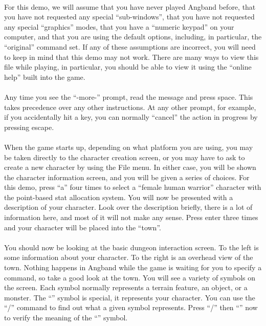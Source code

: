 \paragraph{}For this demo, we will assume that you have never played Angband before,
that you have not requested any special ``sub-windows'', that you have not
requested any special ``graphics'' modes, that you have a ``numeric
keypad''
on your computer, and that you are using the default options, including,
in particular, the ``original'' command set. If any of these assumptions
are incorrect, you will need to keep in mind that this demo may not
work. There are many ways to view this file while playing, in
particular, you should be able to view it using the ``online help'' built
into the game.

\paragraph{}Any time you see the ``-more-'' prompt, read the message and press space.
This takes precedence over any other instructions. At any other prompt,
for example, if you accidentally hit a key, you can normally ``cancel''
the action in progress by pressing escape.

\paragraph{}When the game starts up, depending on what platform you are using, you
may be taken directly to the character creation screen, or you may have
to ask to create a new character by using the File menu. In either
case, you will be shown the character information screen, and you will
be given a series of choices. For this demo, press ``a'' four times to
select a ``female human warrior'' character with the point-based stat
allocation system. You will now be presented with a description of your
character. Look over the description briefly, there is a lot of
information here, and most of it will not make any sense. Press enter
three times and your character will be placed into the ``town''.

\paragraph{}You should now be looking at the basic dungeon interaction screen. To
the left is some information about your character. To the right is an
overhead view of the town. Nothing happens in Angband while the game is
waiting for you to specify a command, so take a good look at the town.
You will see a variety of symbols on the screen. Each symbol normally
represents a terrain feature, an object, or a monster. The ``\@'' symbol
is special, it represents your character. You can use the ``/'' command
to find out what a given symbol represents. Press ``/'' then ``\@'' now to
verify the meaning of the ``\@'' symbol.

